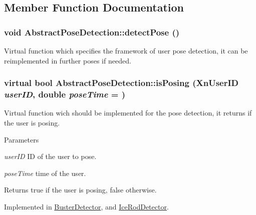 \subsection{Member Function Documentation}
\hypertarget{classAbstractPoseDetection_a2c80bcd1d7efd1f7ad7c0f6e51ab8af4}{
\subsubsection[{detectPose}]{\setlength{\rightskip}{0pt plus 5cm}void AbstractPoseDetection::detectPose ()}}
\label{classAbstractPoseDetection_a2c80bcd1d7efd1f7ad7c0f6e51ab8af4}
Virtual function which specifies the framework of user pose detection, it can be reimplemented in further poses if needed. \hypertarget{classAbstractPoseDetection_ac3343980a1c6b822743b43c4274275e9}{
\subsubsection[{isPosing}]{\setlength{\rightskip}{0pt plus 5cm}virtual bool AbstractPoseDetection::isPosing (XnUserID {\em userID}, \/  double {\em poseTime} = {})}}
\label{classAbstractPoseDetection_ac3343980a1c6b822743b43c4274275e9}
Virtual function wich should be implemented for the pose detection, it returns if the user is posing. 
\begin{DoxyParams}{Parameters}
\item[{\em userID}]ID of the user to pose. \item[{\em poseTime}]time of the user. \end{DoxyParams}
\begin{DoxyReturn}{Returns}
true if the user is posing, false otherwise. 
\end{DoxyReturn}


Implemented in \hyperlink{classBusterDetector_aa5b294c25df6ace744af596bd708c31c}{BusterDetector}, and \hyperlink{classIceRodDetector_a81a33e1302a9f8336d6e8bf49c421e2a}{IceRodDetector}.

